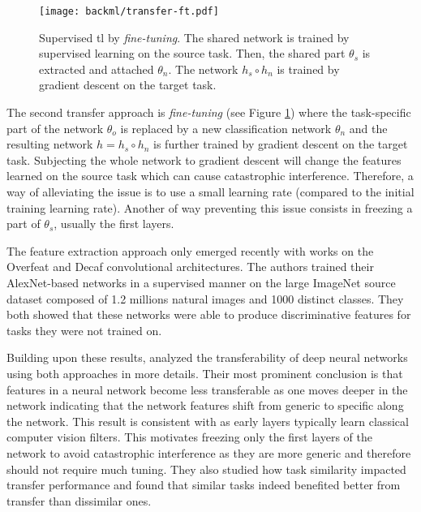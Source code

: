 \begin{figure}
  \centering
  \texttt{[image: backml/transfer-ft.pdf]}
  \caption{Supervised \acrlong{tl} by \textit{fine-tuning}. The shared network is trained by supervised learning on the source task. Then, the shared part $\theta_s$ is extracted and attached $\theta_n$. The network $h_s \circ h_n$ is trained by gradient descent on the target task.}
  \label{fig:backml:transfer-ft}
\end{figure}

The second transfer approach is \textit{fine-tuning} (see Figure \ref{fig:backml:transfer-ft}) where the task-specific part
of the network $\theta_{o}$ is replaced by a new classification network $\theta_{n}$
and the resulting network $h = h_s \circ h_n$ is further trained by gradient
descent on the target task. Subjecting the whole network to gradient descent will
change the features learned on the source task which can cause catastrophic
interference. Therefore, a way of alleviating the issue is to use a small learning
rate (compared to the initial training learning rate). Another of way preventing
this issue consists in freezing a part of $\theta_s$, usually the first layers.

The feature extraction approach only emerged recently with works on the Overfeat
\parencite{sermanet2013overfeat, razavian2014cnn} and Decaf \parencite{donahue2014decaf}
convolutional architectures. The authors trained their AlexNet-based networks in
a supervised manner on the large ImageNet source dataset composed of 1.2 millions
natural images and 1000 distinct classes. They both showed that these networks
were able to produce discriminative features for tasks they were not trained on.

Building upon these results, \parencite{yosinski2014transferable} analyzed the
transferability of deep neural networks using both approaches in more details.
Their most prominent conclusion is that features in a neural network become less
transferable as one moves deeper in the network indicating that the network features
shift from generic to specific along the network. This result is consistent with
\parencite{zeiler2014visualizing} as early layers typically learn classical computer
vision filters. This motivates freezing only the first layers of the network to
avoid catastrophic interference as they are more generic and therefore should not
require much tuning. They also studied how task similarity impacted transfer
performance and found that similar tasks indeed benefited better from transfer
than dissimilar ones.

